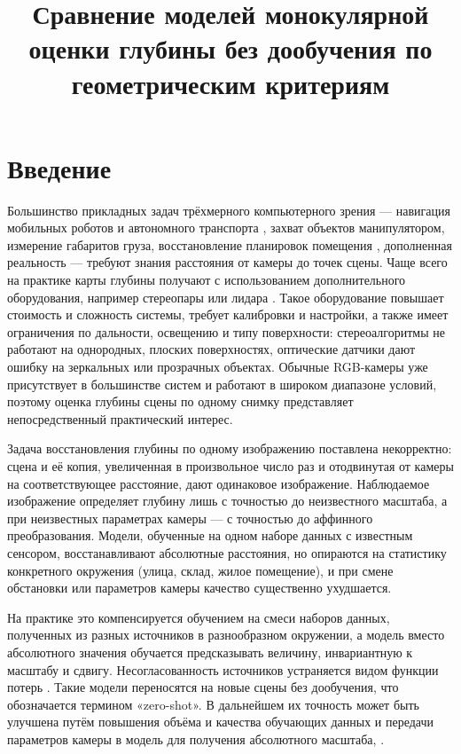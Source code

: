 \documentclass{misisarticle}
\title{Сравнение моделей монокулярной оценки глубины без дообучения по геометрическим критериям}
\begin{document}
\maketitle

\section{Введение}

Большинство прикладных задач трёхмерного компьютерного зрения --- навигация мобильных роботов \cite{pub6} и автономного транспорта \cite{pub7}, захват объектов манипулятором, измерение габаритов груза, восстановление планировок помещения \cite{pub8}, дополненная реальность --- требуют знания расстояния от камеры до точек сцены. Чаще всего на практике карты глубины получают с использованием дополнительного оборудования, например стереопары или лидара \cite{pub9}. Такое оборудование повышает стоимость и сложность системы, требует калибровки и настройки, а также имеет ограничения по дальности, освещению и типу поверхности: стереоалгоритмы не работают на однородных, плоских поверхностях, оптические датчики дают ошибку на зеркальных или прозрачных объектах. Обычные RGB-камеры уже присутствует в большинстве систем и работают в широком диапазоне условий, поэтому оценка глубины сцены по одному снимку представляет непосредственный практический интерес.

Задача восстановления глубины по одному изображению поставлена некорректно: сцена и её копия, увеличенная в произвольное число раз и отодвинутая от камеры на соответствующее расстояние, дают одинаковое изображение. Наблюдаемое изображение определяет глубину лишь с точностью до неизвестного масштаба, а при неизвестных параметрах камеры --- с точностью до аффинного преобразования. Модели, обученные на одном наборе данных с известным сенсором, восстанавливают абсолютные расстояния, но опираются на статистику конкретного окружения (улица, склад, жилое помещение), и при смене обстановки или параметров камеры качество существенно ухудшается.

На практике это компенсируется обучением на смеси наборов данных, полученных из разных источников в разнообразном окружении, а модель вместо абсолютного значения обучается предсказывать величину, инвариантную к масштабу и сдвигу. Несогласованность источников устраняется видом функции потерь \cite{pub1}. Такие модели переносятся на новые сцены без дообучения, что обозначается термином «zero-shot». В дальнейшем их точность может быть улучшена путём повышения объёма и качества обучающих данных \cite{pub2} и передачи параметров камеры в модель для получения абсолютного масштаба\cite{pub3}, \cite{pub4}.
\end{document}

